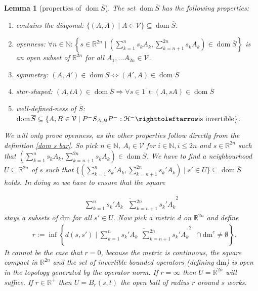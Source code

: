 \documentclass[b5paper,draft,openbib,12pt]{memoir}
\newtheorem{Lemma}[Def]{Lemma}
\DeclareMathOperator{\dom}{dom}
\begin{document}
\begin{Lemma}[properties of \(\dom\overline{S}\)]\label{lem properties of dom s bar}
The set \(\dom \overline{S}\) has the following properties:
\begin{enumerate}
\item contains the diagonal: \(\{(A,A)\mid A\in\mathcal{V}\}\subseteq \dom\overline{S}\).
\item openness: \(\forall n \in \mathbb{N}: \left\{s\in\mathbb{R}^{2n}\mid \left(\sum_{k=1}^n s_k A_k,\sum_{k=n+1}^{2n} s_{k} A_{k} \right)\in \dom\overline{S}\right\}\) is an open subset of \(\mathbb{R}^{2n}\) for all \(A_1,\dots A_{2n}\in\mathcal{V}\).
\item symmetry:  \((A,A')\in\dom\overline{S}\iff (A',A)\in\dom\overline{S}\)
\item star-shaped: \((A,t A)\in \dom\overline{S}\Rightarrow \forall s\in \overline{1~~t} : (A,s A)\in\dom\overline{S}\)
\item well-defined-ness of \(\overline{S}\): \(\dom\overline{S}\subseteq \{A,B\in\mathcal{V}\mid P^- S_{A,B} P^-:\mathcal{H}^- \righttoleftarrow \text{is invertible} \}\).
\end{enumerate}
We will only prove openness, as the other properties follow directly from the definition \eqref{dom s bar}. So pick \(n\in\mathbb{N}\), 
\(A_i\in\mathcal{V}\) for \(i\in \mathbb{N}, i\le 2 n\) and \(s\in\mathbb{R}^{2n}\)
such that \(\left(\sum_{k=1}^n s_k A_k,\sum_{k=n+1}^{2n} s_{k} A_{k} \right)\in\dom\overline{S}\). 
We have to find a neighbourhood \(U\subseteq \mathbb{R}^{2n}\) of \(s\) such that 
\(\{ \left(\sum_{k=1}^n s_k' A_k,\sum_{k=n+1}^{2n} s_{k}' A_{k} \right) \mid s'\in U\}\subseteq \dom\overline{S}\) holds. 
In doing so we have to ensure that the square

\begin{align}
  \overline{\sum_{k=1}^n s_k' A_k~~~\sum_{k=n+1}^{2n} s_{k}' A_{k} }^2
\end{align}
stays a subsets of \(\mathrm{dm}\) for all \(s'\in U\). 
Now pick a metric \(d\) on \(\mathbb{R}^{2n}\) and define 
\begin{align}\nonumber
&r:=\inf \left\{d(s,s')\mid \overline{\sum_{k=1}^n s_k' A_k~~\sum_{k=n+1}^{2n} s_k' A_k }^2 ~~\cap \mathrm{dm}^c\neq \emptyset \right\}.
\end{align}
It cannot be the case that \(r=0\), because the 
metric is continuous, the square compact in 
\(\mathbb{R}^{2n}\) 
and the set of invertible bounded operators 
(defining \(\mathrm{dm}\)) is open in the topology 
generated by the operator norm.
If \(r=\infty\) then \(U=\mathbb{R}^{2n}\) will 
suffice. If \(r\in\mathbb{R}^+\) then \(U=B_r(s,t)\) 
the open ball of radius \(r\) around \(s\) works.
\end{Lemma}
\end{document}
